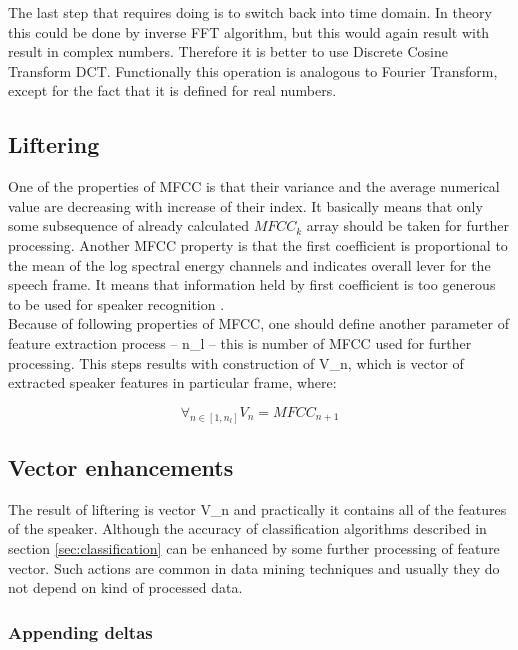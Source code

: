 \documentclass[magister]{dyplom}
\begin{document}
	The last step that requires doing is to switch back into time domain. In theory this could be done by inverse \gls{FFT} algorithm, but this would again result with result in complex numbers. Therefore it is better to use Discrete Cosine Transform \gls{DCT}. Functionally this operation is analogous to Fourier Transform, except for the fact that it is defined for real numbers.
	
	\subsection{Liftering} \label{sec:liftering}
	
	One of the properties of \gls{MFCC} is that their variance and the average numerical value are decreasing with increase of their index. It basically means that only some subsequence of already calculated $MFCC_k$ array should be taken for further processing. Another \gls{MFCC} property is that the first coefficient is proportional to the mean of the log spectral energy channels and indicates overall lever for the speech frame. It means that information held by first coefficient is too generous to be used for speaker recognition \cite{SpeechAnalysis}. \\
	
	Because of following properties of \gls{MFCC}, one should define another parameter of feature extraction process -- \gls{n_l} -- this is number of \gls{MFCC} used for further processing. This steps results with construction of \gls{V_n}, which is vector of extracted speaker features in particular frame, where:
	
	\begin{equation}
		\forall_{n \in [1, n_l]} V_n = MFCC_{n+1}
	\end{equation}	 
	
	\subsection{Vector enhancements}
	
	The result of liftering is vector \gls{V_n} and practically it contains all of the features of the speaker. Although the accuracy of classification algorithms described in section \ref{sec:classification} can be enhanced by some further processing of feature vector. Such actions are common in data mining techniques and usually they do not depend on kind of processed data.
	
	\subsubsection{Appending deltas}
	
\end{document}
